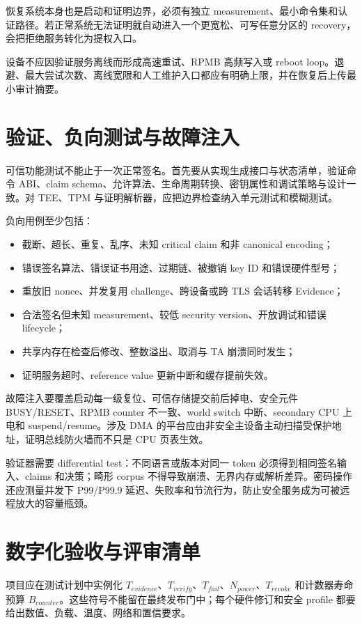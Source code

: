 恢复系统本身也是启动和证明边界，必须有独立 measurement、最小命令集和认证路径。若正常系统无法证明就自动进入一个更宽松、可写任意分区的 recovery，会把拒绝服务转化为提权入口。

设备不应因验证服务离线而形成高速重试、RPMB 高频写入或 reboot loop。退避、最大尝试次数、离线宽限和人工维护入口都应有明确上限，并在恢复后上传最小审计摘要。

\section{验证、负向测试与故障注入}

可信功能测试不能止于一次正常签名。首先要从实现生成接口与状态清单，验证命令 ABI、claim schema、允许算法、生命周期转换、密钥属性和调试策略与设计一致。对 TEE、TPM 与证明解析器，应把边界检查纳入单元测试和模糊测试。

负向用例至少包括：

\begin{itemize}
  \item 截断、超长、重复、乱序、未知 critical claim 和非 canonical encoding；
  \item 错误签名算法、错误证书用途、过期链、被撤销 key ID 和错误硬件型号；
  \item 重放旧 nonce、并发复用 challenge、跨设备或跨 TLS 会话转移 Evidence；
  \item 合法签名但未知 measurement、较低 security version、开放调试和错误 lifecycle；
  \item 共享内存在检查后修改、整数溢出、取消与 TA 崩溃同时发生；
  \item 证明服务超时、reference value 更新中断和缓存提前失效。
\end{itemize}

故障注入要覆盖启动每一级复位、可信存储提交前后掉电、安全元件 BUSY/RESET、RPMB counter 不一致、world switch 中断、secondary CPU 上电和 suspend/resume。涉及 DMA 的平台应由非安全主设备主动扫描受保护地址，证明总线防火墙而不只是 CPU 页表生效。

验证器需要 differential test：不同语言或版本对同一 token 必须得到相同签名输入、claims 和决策；畸形 corpus 不得导致崩溃、无界内存或解析差异。密码操作还应测量并发下 P99/P99.9 延迟、失败率和节流行为，防止安全服务成为可被远程放大的容量瓶颈。

\section{数字化验收与评审清单}

项目应在测试计划中实例化 $T_{evidence}$、$T_{verify}$、$T_{fail}$、$N_{power}$、$T_{revoke}$ 和计数器寿命预算 $B_{counter}$。这些符号不能留在最终发布门中；每个硬件修订和安全 profile 都要给出数值、负载、温度、网络和置信要求。


